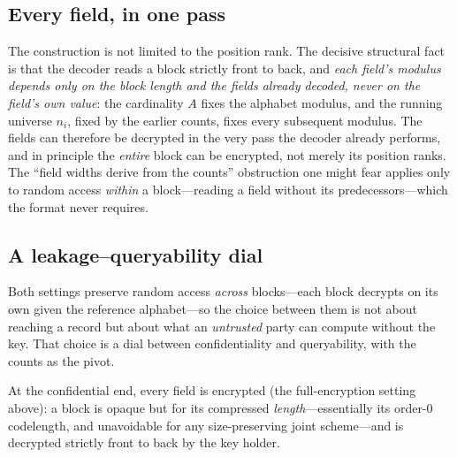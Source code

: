 \documentclass[entropy,article,submit,oneauthor,pdftex]{Definitions/mdpi}
\begin{document}
\subsection{Every field, in one pass}
The construction is not limited to the position rank. The decisive structural fact
is that the decoder reads a block strictly front to back, and \emph{each field's
modulus depends only on the block length and the fields already decoded, never on
the field's own value}: the cardinality $A$ fixes the alphabet modulus, and the
running universe $n_i$, fixed by the earlier counts, fixes every subsequent modulus.
The fields can therefore be decrypted in the very pass the decoder already performs,
and in principle the \emph{entire} block can be encrypted, not merely its position
ranks. The ``field widths derive from the counts'' obstruction one might fear
applies only to random access \emph{within} a block---reading a field without its
predecessors---which the format never requires.

\subsection{A leakage--queryability dial}\label{sec:dial}
Both settings preserve random access \emph{across} blocks---each block decrypts on
its own given the reference alphabet---so the choice between them is not about reaching a
record but about what an \emph{untrusted} party can compute without the key. That
choice is a dial between confidentiality and queryability, with the counts as the
pivot.

At the confidential end, every field is encrypted (the full-encryption setting
above): a block is opaque but for its compressed \emph{length}---essentially its
order-$0$ codelength, and unavoidable for any size-preserving joint scheme---and is
decrypted strictly front to back by the key holder.
\end{document}

